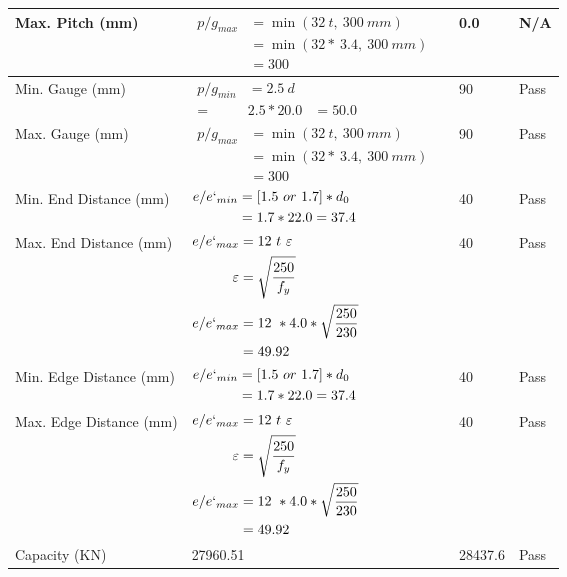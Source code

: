 \documentclass{article}%
\begin{document}
\begin{longtable}{|p{4cm}|p{5cm}|p{5.5cm}|p{1.5cm}|}
\hline%
Max. Pitch (mm)&$\begin{aligned}p/g_{max} &=\min(32~t,~300~mm)&\\ &=\min(32 *~3.4,~ 300 ~mm)\\&=300\end{aligned}$&0.0&N/A\\%
\hline%
Min. Gauge (mm)&$\begin{aligned}p/g_{min}&= 2.5 ~ d&\\ =&2.5*20.0&=50.0\end{aligned}$&90&Pass\\%
\hline%
Max. Gauge (mm)&$\begin{aligned}p/g_{max} &=\min(32~t,~300~mm)&\\ &=\min(32 *~3.4,~ 300 ~mm)\\&=300\end{aligned}$&90&Pass\\%
\hline%
Min. End Distance (mm)&$\begin{aligned}e/e`_{min} &=[1.5~or~ 1.7] * d_0\\ &=1.7*22.0=37.4 \end{aligned}$&40&Pass\\%
\hline%
Max. End Distance (mm)&$\begin{aligned}e/e`_{max} &= 12~ t~ \varepsilon&\\ \varepsilon &= \sqrt{\frac{250}{f_y}}\\ e/e`_{max}&=12 ~*4.0*\sqrt{\frac{250}{230}}\\ &=49.92\\ \end{aligned}$&40&Pass\\%
\hline%
Min. Edge Distance (mm)&$\begin{aligned}e/e`_{min} &=[1.5~or~ 1.7] * d_0\\ &=1.7*22.0=37.4 \end{aligned}$&40&Pass\\%
\hline%
Max. Edge Distance (mm)&$\begin{aligned}e/e`_{max} &= 12~ t~ \varepsilon&\\ \varepsilon &= \sqrt{\frac{250}{f_y}}\\ e/e`_{max}&=12 ~*4.0*\sqrt{\frac{250}{230}}\\ &=49.92\\ \end{aligned}$&40&Pass\\%
\hline%
Capacity (KN)&27960.51&28437.6&Pass\\%
\hline%
\end{longtable}
\end{document}
